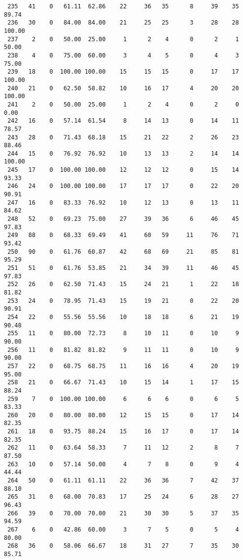 \begin{verbatim}
 235   41    0   61.11  62.86    22     36   35      8     39    35    89.74
 236   30    0   84.00  84.00    21     25   25      3     28    28   100.00
 237    2    0   50.00  25.00     1      2    4      0      2     1    50.00
 238    4    0   75.00  60.00     3      4    5      0      4     3    75.00
 239   18    0  100.00 100.00    15     15   15      0     17    17   100.00
 240   21    0   62.50  58.82    10     16   17      4     20    20   100.00
 241    2    0   50.00  25.00     1      2    4      0      2     0     0.00
 242   16    0   57.14  61.54     8     14   13      0     14    11    78.57
 243   28    0   71.43  68.18    15     21   22      2     26    23    88.46
 244   15    0   76.92  76.92    10     13   13      2     14    14   100.00
 245   17    0  100.00 100.00    12     12   12      0     15    14    93.33
 246   24    0  100.00 100.00    17     17   17      0     22    20    90.91
 247   16    0   83.33  76.92    10     12   13      0     13    11    84.62
 248   52    0   69.23  75.00    27     39   36      6     46    45    97.83
 249   88    0   68.33  69.49    41     60   59     11     76    71    93.42
 250   90    0   61.76  60.87    42     68   69     21     85    81    95.29
 251   51    0   61.76  53.85    21     34   39     11     46    45    97.83
 252   26    0   62.50  71.43    15     24   21      1     22    18    81.82
 253   24    0   78.95  71.43    15     19   21      0     22    20    90.91
 254   22    0   55.56  55.56    10     18   18      6     21    19    90.48
 255   11    0   80.00  72.73     8     10   11      0     10     9    90.00
 256   11    0   81.82  81.82     9     11   11      0     10     9    90.00
 257   22    0   68.75  68.75    11     16   16      4     20    19    95.00
 258   21    0   66.67  71.43    10     15   14      1     17    15    88.24
 259    7    0  100.00 100.00     6      6    6      0      6     5    83.33
 260   20    0   80.00  80.00    12     15   15      0     17    14    82.35
 261   18    0   93.75  88.24    15     16   17      0     17    14    82.35
 262   11    0   63.64  58.33     7     11   12      2      8     7    87.50
 263   10    0   57.14  50.00     4      7    8      0      9     4    44.44
 264   50    0   61.11  61.11    22     36   36      7     42    37    88.10
 265   31    0   68.00  70.83    17     25   24      6     28    27    96.43
 266   39    0   70.00  70.00    21     30   30      5     37    35    94.59
 267    6    0   42.86  60.00     3      7    5      0      5     4    80.00
 268   36    0   58.06  66.67    18     31   27      7     35    30    85.71

\end{verbatim}

